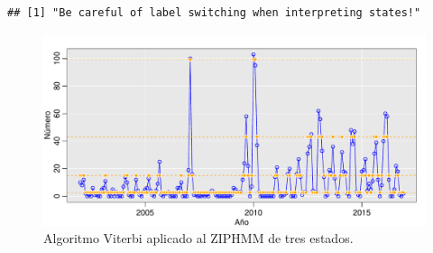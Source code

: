 \documentclass[a4paper]{article}\usepackage[]{graphicx}\usepackage[]{color}
\makeatletter
\def\maxwidth{ %
  \ifdim\Gin@nat@width>\linewidth
    \linewidth
  \else
    \Gin@nat@width
  \fi
}
\newenvironment{kframe}{%
 \def\at@end@of@kframe{}%
 \ifinner\ifhmode%
  \def\at@end@of@kframe{\end{minipage}}%
  \begin{minipage}{\columnwidth}%
 \fi\fi%
 \def\FrameCommand##1{\hskip\@totalleftmargin \hskip-\fboxsep
 \colorbox{shadecolor}{##1}\hskip-\fboxsep
     \hskip-\linewidth \hskip-\@totalleftmargin \hskip\columnwidth}%
 \MakeFramed {\advance\hsize-\width
   \@totalleftmargin\z@ \linewidth\hsize
   \@setminipage}}%
 {\par\unskip\endMakeFramed%
 \at@end@of@kframe}
\newenvironment{knitrout}{}{} %
\makeatother
\begin{document}
\begin{knitrout}
\color{fgcolor}\begin{kframe}
\begin{verbatim}
## [1] "Be careful of label switching when interpreting states!"
\end{verbatim}
\end{kframe}
\end{knitrout}

\begin{knitrout}
\color{fgcolor}\begin{figure}
\includegraphics[width=\maxwidth]{figure/unnamed-chunk-45-1} \caption[Algoritmo Viterbi aplicado al ZIPHMM de tres estados]{Algoritmo Viterbi aplicado al ZIPHMM de tres estados.}\label{fig:unnamed-chunk-45}
\end{figure}


\end{knitrout}
\end{document}
